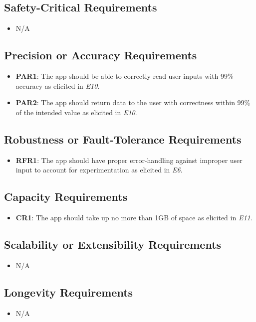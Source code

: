 \documentclass[12pt]{article}
\begin{document}
\subsection{Safety-Critical Requirements}
\begin{itemize}
  \item N/A
\end{itemize}
\subsection{Precision or Accuracy Requirements}
\begin{itemize}
  \item \textbf{PAR1}: The app should be able to correctly read user inputs with 99\% accuracy as elicited
  in \textit{E10}.
  \item \textbf{PAR2}: The app should return data to the user with correctness within 99\% of the intended value
  as elicited in \textit{E10}.
\end{itemize}
\subsection{Robustness or Fault-Tolerance Requirements}
\begin{itemize}
  \item \textbf{RFR1}: The app should have proper error-handling against improper user input to account for
  experimentation as elicited in \textit{E6}.
\end{itemize}
\subsection{Capacity Requirements}
\begin{itemize}
  \item \textbf{CR1}: The app should take up no more than 1GB of space as elicited in \textit{E11}.
\end{itemize}
\subsection{Scalability or Extensibility Requirements}
\begin{itemize}
  \item N/A
\end{itemize}
\subsection{Longevity Requirements}
\begin{itemize}
  \item N/A
\end{itemize}
\end{document}
